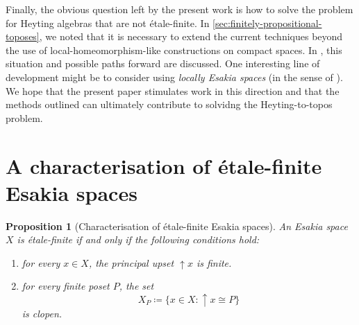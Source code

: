 \documentclass[12pt]{amsart}
\theoremstyle{plain}
\newtheorem{proposition}[theorem]{Proposition}
\theoremstyle{definition}
\renewcommand{\u}{{\uparrow}}
\begin{document}
Finally, the obvious question left by the present work is how to solve the problem for Heyting algebras that are not étale-finite. In \cref{sec:finitely-propositional-toposes}, we noted that it is necessary to extend the current techniques beyond the use of local-homeomorphism-like constructions on compact spaces.
In \cite[Ch.~6]{almeidaphdthesis}, this situation and possible paths forward are discussed. One interesting line of development might be to consider using \emph{locally Esakia spaces} (in the sense of \cite{locallyesakiaspaces}).
We hope that the present paper stimulates work in this direction and that the methods outlined can ultimately contribute to solvidng the Heyting-to-topos problem.



\appendix
\section{A characterisation of étale-finite Esakia spaces}
\label{s:app-char}




\begin{proposition}[Characterisation of étale-finite Esakia spaces] \label{p:finite-principal-upset-types}
    An Esakia space $X$ is étale-finite if and only if the following conditions hold:
    \begin{enumerate}
        \item for every $x \in X$, the principal upset $\u x$ is finite.
        \item for every finite poset $P$, the set
        \[
            X_P \coloneqq \{x\in X : {\u}x\cong P\}
        \]
        is clopen.
    \end{enumerate}
\end{proposition}
\end{document}
